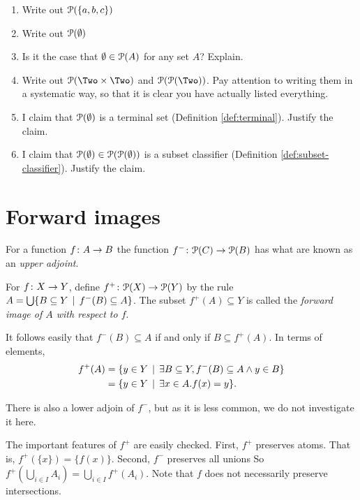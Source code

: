 \begin{exercises}
	\begin{enumerate}
		\item Write out ${\mathcal{P}}(\{a,b,c\})$
		\item Write out ${\mathcal{P}}(\emptyset)$
		\item Is it the case that $\emptyset \in {\mathcal{P}}(A)$ for any set $A$? Explain. 
		\item Write out $\powerset(\Two\times \Two)$ and $\powerset(\powerset(\Two))$. Pay attention to writing them in a systematic way, so that it is clear you have actually listed everything.
		\item I claim that ${\mathcal{P}}(\emptyset)$ is a terminal set (Definition \ref{def:terminal}). Justify the claim.
		\item I claim that ${\mathcal{P}}(\emptyset)\in {\mathcal{P}}({\mathcal{P}}(\emptyset))$ is a subset classifier (Definition \ref{def:subset-classifier}). Justify the claim.
	\end{enumerate}
\end{exercises}

\section{Forward images}

For a function ${f}\colon{A}\to{B}$ the function ${f^-}\colon{{\mathcal{P}}(C)}\to{{\mathcal{P}}(B)}$ has what are known as an \emph{upper adjoint}. 

\begin{defn}
	For ${f}\colon{X}\to{Y}$, define ${f^+}\colon{{\mathcal{P}}(X)}\to{{\mathcal{P}}(Y)}$ by the rule $A= \bigcup\{B\subseteq Y\,\mid\, f^-(B)\subseteq A\}$. The subset 
	$f^+(A)\subseteq Y$ is called the \emph{forward image of $A$ with respect to $f$}.
\end{defn}

It follows easily that $f^-(B)\subseteq A$ if and only if $B\subseteq f^+(A)$.
In terms of elements, 
\begin{align*}
f^+(A) &= \{y\in Y\,\mid\, \exists B\subseteq Y, f^-(B)\subseteq A \wedge y\in B\}\\
       &= \{y\in Y\,\mid\, \exists x\in A.f(x)=y\}.
\end{align*}

There is also a lower adjoin of $f^-$, but as it is less common, we do not investigate it here.

The important features of $f^+$ are easily checked. First, $f^+$ preserves atoms.
That is, $f^+(\{x\}) = \{f(x)\}$. 
Second, $f^-$ preserves all unions So $f^+(\bigcup_{i\in I}A_i) = \bigcup_{i\in I}f^+(A_i)$. Note that $f$ does not necessarily preserve intersections.


